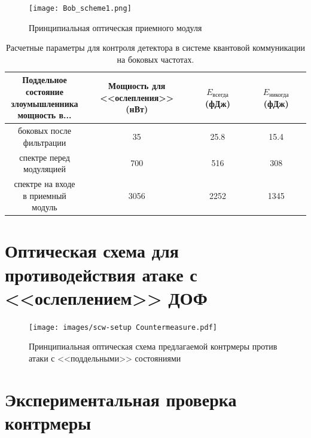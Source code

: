  
 \begin{figure}[ht]
  \centering
  \texttt{[image: Bob\_scheme1.png]}
  \caption{Принципиальная оптическая приемного модуля}
  \label{fig:Bob}
\end{figure}


\begin{table}
	\caption{\label{tab:blinding}Расчетные параметры для контроля детектора в системе квантовой коммуникации на боковых частотах.}
	\begin{tabular}[t]{c c c c}
	\hline\hline
	\makecell{Поддельное\\состояние\\злоумышленника\\мощность в...} & \makecell{Мощность для\\<<ослепления>> (нВт)} & $E_\text{всегда}$ (фДж) & $E_\text{никогда}$ (фДж) \\
	\hline
	\makecell{боковых после\\ фильтрации} & 35 & 25.8 & 15.4 \\
	\makecell{спектре перед\\ модуляцией} & 700 & 516 & 308 \\
	\makecell{спектре на входе\\ в приемный модуль} & 3056 & 2252 & 1345 \\
	\hline\hline
	\end{tabular}
\end{table}


\pagebreak


\section{Оптическая схема для противодействия атаке с <<ослеплением>> ДОФ} \label{ch:ch3/sec4}


 \begin{figure}[ht]
  \centering
  \texttt{[image: images/scw-setup Countermeasure.pdf]}
  \caption{Принципиальная оптическая схема предлагаемой контрмеры против атаки с <<поддельными>> состояниями}
  \label{fig:countermeasure}
\end{figure}

\pagebreak

\section{Экспериментальная проверка контрмеры} \label{ch:ch3/sec5}


